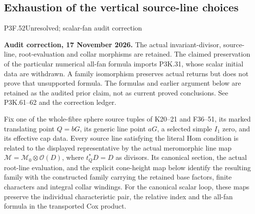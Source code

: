 \subsection{Exhaustion of the vertical source-line choices}
\begin{statement}{P3F.52}{Unresolved; scalar-fan audit correction}
\par\noindent\textbf{Audit correction, 17 November 2026.} The actual invariant-divisor, source-line, root-evaluation and collar morphisms are retained. The claimed preservation of the particular numerical all-fan formula imports P3K.31, whose scalar initial data are withdrawn. A family isomorphism preserves actual returns but does not prove that unsupported formula. The formulas and earlier argument below are retained as the audited prior claim, not as current proved conclusions. See P3K.61--62 and the correction ledger.
\medskip


Fix one of the whole-fibre sphere source tuples of K20--21 and
F36--51, its marked translating point \(Q=bG\), its generic line
point \(aG\), a selected simple \(I_1\) zero, and its effective
cap data. Every source line satisfying the literal Hom condition
is related to the displayed representative by the actual
meromorphic line map \(\mathcal M=\mathcal M_0\otimes\mathcal O(D)\),
where \(t_Q^*D=D\) as divisors.
Its canonical section, the actual root-line evaluation, and the
explicit cone-height map below identify the resulting family
with the constructed family carrying the retained base factors,
finite characters and integral collar windings.
For the canonical scalar loop, these maps preserve the individual
characteristic pair, the relative index and the all-fan formula
in the transported Cox product.
\end{statement}
